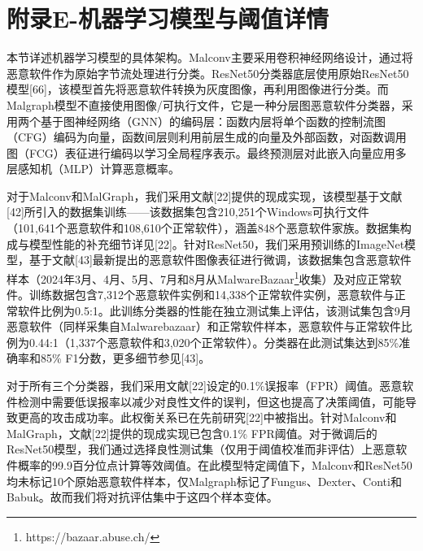 \chapter{附录E-机器学习模型与阈值详情}

本节详述机器学习模型的具体架构。Malconv主要采用卷积神经网络设计，通过将恶意软件作为原始字节流处理进行分类。ResNet50分类器底层使用原始ResNet50模型[66]，该模型首先将恶意软件转换为灰度图像，再利用图像进行分类。而Malgraph模型不直接使用图像/可执行文件，它是一种分层图恶意软件分类器，采用两个基于图神经网络（GNN）的编码层：函数内层将单个函数的控制流图（CFG）编码为向量，函数间层则利用前层生成的向量及外部函数，对函数调用图（FCG）表征进行编码以学习全局程序表示。最终预测层对此嵌入向量应用多层感知机（MLP）计算恶意概率。

对于Malconv和MalGraph，我们采用文献[22]提供的现成实现，该模型基于文献[42]所引入的数据集训练——该数据集包含210,251个Windows可执行文件（101,641个恶意软件和108,610个正常软件），涵盖848个恶意软件家族。数据集构成与模型性能的补充细节详见[22]。针对ResNet50，我们采用预训练的ImageNet模型，基于文献[43]最新提出的恶意软件图像表征进行微调，该数据集包含恶意软件样本（2024年3月、4月、5月、7月和8月从MalwareBazaar\footnote{https://bazaar.abuse.ch/}收集）及对应正常软件。训练数据包含7,312个恶意软件实例和14,338个正常软件实例，恶意软件与正常软件比例为0.5:1。此训练分类器的性能在独立测试集上评估，该测试集包含9月恶意软件（同样采集自Malwarebazaar）和正常软件样本，恶意软件与正常软件比例为0.44:1（1,337个恶意软件和3,020个正常软件）。分类器在此测试集达到85\%准确率和85\% F1分数，更多细节参见[43]。

对于所有三个分类器，我们采用文献[22]设定的0.1\%误报率（FPR）阈值。恶意软件检测中需要低误报率以减少对良性文件的误判，但这也提高了决策阈值，可能导致更高的攻击成功率。此权衡关系已在先前研究[22]中被指出。针对Malconv和MalGraph，文献[22]提供的现成实现已包含0.1\% FPR阈值。对于微调后的ResNet50模型，我们通过选择良性测试集（仅用于阈值校准而非评估）上恶意软件概率的99.9百分位点计算等效阈值。在此模型特定阈值下，Malconv和ResNet50均未标记10个原始恶意软件样本，仅Malgraph标记了Fungus、Dexter、Conti和Babuk。故而我们将对抗评估集中于这四个样本变体。